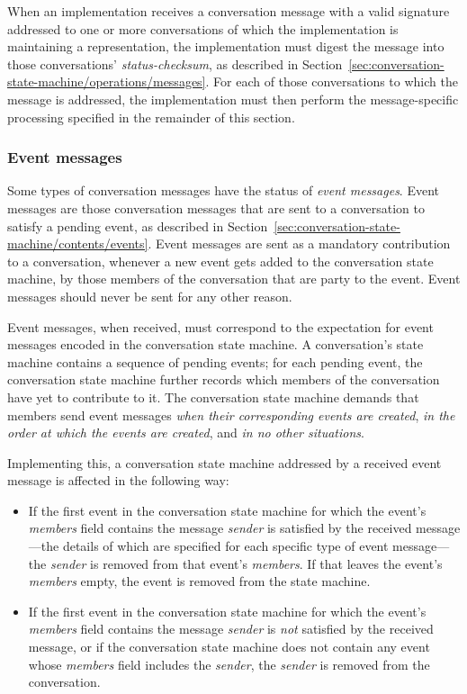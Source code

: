 \documentclass{article}
\def\field#1{\textit{#1}}
\def\smfield#1{\textsl{#1}}
\begin{document}
When an implementation receives a conversation message with a valid signature addressed to one or more conversations of which the implementation is maintaining a representation, the implementation must digest the message into those conversations' \smfield{status-checksum}, as described in Section~\ref{sec:conversation-state-machine/operations/messages}.
For each of those conversations to which the message is addressed, the implementation must then perform the message-specific processing specified in the remainder of this section.


\subsubsection{Event messages}
\label{sec:messages/event-messages}

Some types of conversation messages have the status of \emph{event messages}.
Event messages are those conversation messages that are sent to a conversation to satisfy a pending event, as described in Section~\ref{sec:conversation-state-machine/contents/events}.
Event messages are sent as a mandatory contribution to a conversation, whenever a new event gets added to the conversation state machine, by those members of the conversation that are party to the event.
Event messages should never be sent for any other reason.

Event messages, when received, must correspond to the expectation for event messages encoded in the conversation state machine.
A conversation's state machine contains a sequence of pending events; for each pending event, the conversation state machine further records which members of the conversation have yet to contribute to it.
The conversation state machine demands that members send event messages \emph{when their corresponding events are created}, \emph{in the order at which the events are created}, and \emph{in no other situations}.

Implementing this, a conversation state machine addressed by a received event message is affected in the following way:
\begin{itemize}
\item If the first event in the conversation state machine for which the event's \smfield{members} field contains the message \field{sender} is satisfied by the received message ---the details of which are specified for each specific type of event message--- the \field{sender} is removed from that event's \smfield{members}. If that leaves the event's \smfield{members} empty, the event is removed from the state machine.
\item If the first event in the conversation state machine for which the event's \smfield{members} field contains the message \field{sender} is \emph{not} satisfied by the received message, or if the conversation state machine does not contain any event whose \smfield{members} field includes the \field{sender}, the \field{sender} is removed from the conversation.
\end{itemize}
\end{document}
